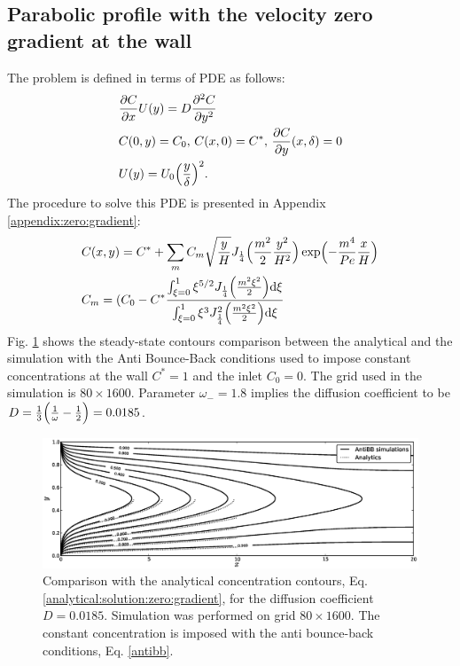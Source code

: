 \documentclass{article}
\newcommand{\beq}{\begin{equation}}
\newcommand{\feq}{\end{equation}}
\newcommand{\cstar}{C^{*}}
\newcommand{\omegaminus}{\omega_{-}}
\begin{document}
\subsection{Parabolic profile with the velocity zero gradient at the wall}
The problem is defined in terms of PDE as follows: 
\beq
\begin{aligned}
&\frac{\partial C}{\partial x} U(y)=D\frac{\partial^2 C}{\partial y^2}\\
&C(0,y)=C_0,\, C(x,0)=\cstar,\, \frac{\partial C}{\partial y }(x,\delta)=0\\
&U(y)=U_0 \Bigl(\frac{y}{\delta}\Bigr)^2.
\end{aligned}
\feq
The procedure to solve this PDE is presented in Appendix \ref{appendix:zero:gradient}:
\beq
\label{analytical:solution:zero:gradient}
\begin{aligned}
&C(x,y)=\cstar+\sum_{m}{C_m
\sqrt{\frac{y}{H}}J_{\frac{1}{4}}\Bigl(\frac{m^2}{2}\frac{y^2}{H^2}\Bigr)\exp\Bigl(-\frac{m^4}{Pe}
\frac { x }{H}\Bigr)}\\
&C_m = (C_0-\cstar \frac{\int_{\xi=0}^{1}{\xi^{5/2} J_{\frac{1}{4}}\Bigl(\frac{m^2
\xi^2}{2}\Bigr)\mathrm{d}\xi}}{\int_{\xi=0}^{1}{\xi^3 J_{\frac{1}{4}}^2\Bigl(\frac{m^2
\xi^2}{2}\Bigr)\mathrm{d}\xi}}
\end{aligned}
\feq
Fig. \ref{fig:parabolic:zero:gradient} shows the steady-state contours comparison between the
analytical and the simulation with the Anti Bounce-Back conditions used to impose constant
concentrations at the wall $\cstar=1$ and the inlet $C_0=0$. The grid used in the simulation is
$80\times1600$. Parameter $\omegaminus=1.8$ implies the diffusion coefficient to be
$D=\frac{1}{3}\Bigl(\frac{1}{\omega}-\frac{1}{2}\Bigr)=0.0185$.  
\begin{figure}[htb!]
\includegraphics[width=\textwidth]{Figures/parabolic_profile_zero_gradient_comparison.eps}
\caption{Comparison with the analytical concentration contours, Eq.
\ref{analytical:solution:zero:gradient}, for the diffusion coefficient $D=0.0185$. Simulation was
performed on grid $80\times 1600$. The constant concentration is imposed with the
anti bounce-back conditions, Eq. \ref{antibb}. \label{fig:parabolic:zero:gradient}}
\end{figure}
 
\end{document}
